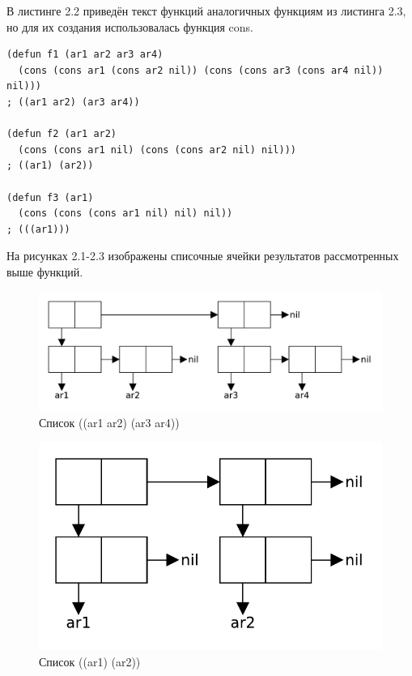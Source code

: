 В листинге 2.2 приведён текст функций аналогичных функциям из листинга 2.3, но для их создания использовалась функция cons.

\begin{lstlisting}[caption={Примеры функций с использованием функции list}]
(defun f1 (ar1 ar2 ar3 ar4)
  (cons (cons ar1 (cons ar2 nil)) (cons (cons ar3 (cons ar4 nil)) nil)))
; ((ar1 ar2) (ar3 ar4))

(defun f2 (ar1 ar2)
  (cons (cons ar1 nil) (cons (cons ar2 nil) nil)))
; ((ar1) (ar2))

(defun f3 (ar1)
  (cons (cons (cons ar1 nil) nil) nil))
; (((ar1)))
\end{lstlisting}

На рисунках 2.1-2.3 изображены списочные ячейки результатов рассмотренных выше функций.
\begin{figure}[H]
    \centering
    \includegraphics[scale=0.60]{data/pdf/02-01.pdf}
    \caption{Список ((ar1 ar2) (ar3 ar4))}
\end{figure}

\begin{figure}[H]
    \centering
    \includegraphics[scale=0.60]{data/pdf/02-02.pdf}
    \caption{Список ((ar1) (ar2))}
\end{figure}

